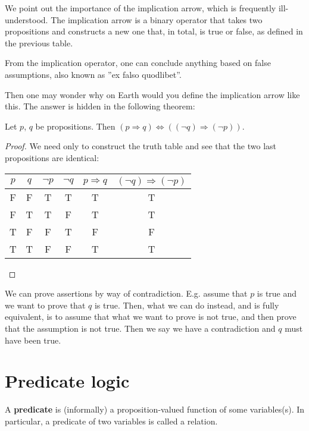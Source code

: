 \documentclass[root.tex]{subfiles}
\begin{document}
We point out the importance of the implication arrow, which is frequently ill-understood. The implication arrow is a binary operator that takes two propositions and constructs a new one that, in total, is true or false, as defined in the previous table.
\begin{remark}
  From the implication operator, one can conclude anything based on false assumptions, also known as ''ex falso quodlibet''.
\end{remark}
Then one may wonder why on Earth would you define the implication arrow like this. The answer is hidden in the following theorem: 
\begin{theorem}
  Let $p$, $q$ be propositions. Then $(p \Rightarrow q) \Leftrightarrow ((\neg q)\Rightarrow (\neg p))$.
\end{theorem}
\newpage
\begin{proof}
  We need only to construct the truth table and see that the two last propositions are identical:
    \begin{table}[h]
      \centering
      \begin{tabular}{c|c||c|c|c|c}
        $p$ & $q$ & $\neg p$ & $ \neg q$ & $p \Rightarrow q$ & $(\neg q) \Rightarrow (\neg p)$ \\
        \hline
          \rule{0pt}{12pt} F & F & T & T & T & T\\
                           F & T & T & F & T & T\\
                           T & F & F & T & F & F\\
                           T & T & F & F & T & T
      \end{tabular}
    \end{table}

\end{proof}

\begin{corollary}
  We can prove assertions by way of contradiction. E.g. assume that $p$ is true and we want to prove that $q$ is true. Then, what we can do instead, and is fully equivalent, is to assume that what we want to prove is not true, and then prove that the assumption is not true. Then we say we have a contradiction and $q$ must have been true.
\end{corollary}


\section{Predicate logic}%
\begin{mydef}
  A \textbf{predicate} is (informally) a proposition-valued function of some variables(s). In particular, a predicate of two variables is called a relation.
\end{mydef}
\end{document}
